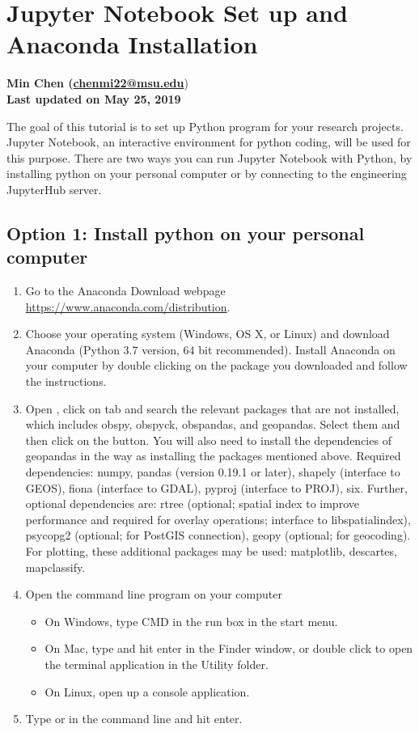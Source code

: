 \documentclass[12pt]{article}   	%
\begin{document}
\section*{Jupyter Notebook Set up and Anaconda Installation}

\textbf{Min Chen (\href{chenmi22@msu.edu}{chenmi22@msu.edu}}) \\ 
\textbf{Last updated on May 25, 2019}

The goal of this tutorial is to set up Python program for your research projects. Jupyter Notebook, an interactive environment for python coding, will be used for this purpose. 
There are two ways you can run Jupyter Notebook with Python, by installing python on your personal computer or by connecting to the engineering JupyterHub server.

\subsection*{Option 1: Install python on your personal computer}
\begin{enumerate}[noitemsep]
\item Go to the Anaconda Download webpage \href{https://www.anaconda.com/distribution}{https://www.anaconda.com/distribution}.
\item Choose your operating system (Windows, OS X, or Linux) and download Anaconda (Python 3.7 version, 64 bit recommended). 
Install Anaconda on your computer by double clicking on the package you downloaded and follow the instructions.
\item Open ,  click on  tab and search the relevant packages that are not installed, which includes
obspy, obspyck, obspandas, and geopandas. Select them and then click on the  button. You will also need to install the dependencies of 
geopandas in the way as installing the packages mentioned above. Required dependencies: numpy, pandas (version 0.19.1 or later), shapely (interface to GEOS),
fiona (interface to GDAL), pyproj (interface to PROJ), six. Further, optional dependencies are: rtree 
(optional; spatial index to improve performance and required for overlay operations; interface to libspatialindex), psycopg2 (optional; for PostGIS connection),
geopy (optional; for geocoding). For plotting, these additional packages may be used: matplotlib, descartes, mapclassify.

\item Open the command line program on your computer
\begin{itemize}[noitemsep]
\item On Windows, type CMD in the run box in the start menu.
\item On Mac, type  and hit enter in the Finder window, or double click to open the terminal application in the Utility folder.
\item On Linux, open up a console application.
\end{itemize}
\item Type  or  in the command line and hit enter.
\end{enumerate}
\end{document}
